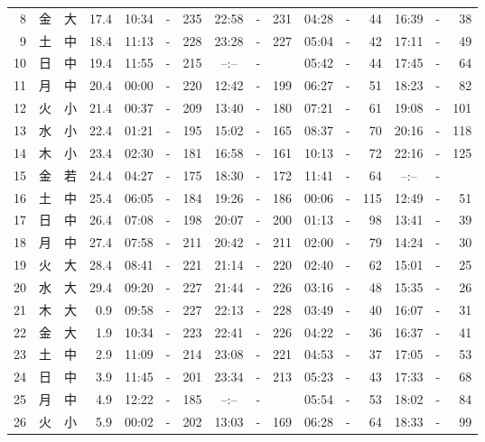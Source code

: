 \documentclass[12pt.a4j]{jsarticle}
\begin{document}
\begin{center}
\begin{table}[ht]
\begin{tabular}{|rc|cr|ccrccr|ccrccr|}
 8 & 金 & 大 & 17.4 &  10:34 &-& 235  &  22:58 &-& 231  &   04:28 &-&  44  &   16:39 &-&  38  \\
 9 & 土 & 中 & 18.4 &  11:13 &-& 228  &  23:28 &-& 227  &   05:04 &-&  42  &   17:11 &-&  49  \\
10 & 日 & 中 & 19.4 &  11:55 &-& 215  &  --:-- &-&     &   05:42 &-&  44  &   17:45 &-&  64  \\
11 & 月 & 中 & 20.4 &  00:00 &-& 220  &  12:42 &-& 199  &   06:27 &-&  51  &   18:23 &-&  82  \\
12 & 火 & 小 & 21.4 &  00:37 &-& 209  &  13:40 &-& 180  &   07:21 &-&  61  &   19:08 &-& 101  \\
13 & 水 & 小 & 22.4 &  01:21 &-& 195  &  15:02 &-& 165  &   08:37 &-&  70  &   20:16 &-& 118  \\
14 & 木 & 小 & 23.4 &  02:30 &-& 181  &  16:58 &-& 161  &   10:13 &-&  72  &   22:16 &-& 125  \\
15 & 金 & 若 & 24.4 &  04:27 &-& 175  &  18:30 &-& 172  &   11:41 &-&  64  &   --:-- &-&     \\
16 & 土 & 中 & 25.4 &  06:05 &-& 184  &  19:26 &-& 186  &   00:06 &-& 115  &   12:49 &-&  51  \\
17 & 日 & 中 & 26.4 &  07:08 &-& 198  &  20:07 &-& 200  &   01:13 &-&  98  &   13:41 &-&  39  \\
18 & 月 & 中 & 27.4 &  07:58 &-& 211  &  20:42 &-& 211  &   02:00 &-&  79  &   14:24 &-&  30  \\
19 & 火 & 大 & 28.4 &  08:41 &-& 221  &  21:14 &-& 220  &   02:40 &-&  62  &   15:01 &-&  25  \\
20 & 水 & 大 & 29.4 &  09:20 &-& 227  &  21:44 &-& 226  &   03:16 &-&  48  &   15:35 &-&  26  \\
21 & 木 & 大 &  0.9 &  09:58 &-& 227  &  22:13 &-& 228  &   03:49 &-&  40  &   16:07 &-&  31  \\
22 & 金 & 大 &  1.9 &  10:34 &-& 223  &  22:41 &-& 226  &   04:22 &-&  36  &   16:37 &-&  41  \\
23 & 土 & 中 &  2.9 &  11:09 &-& 214  &  23:08 &-& 221  &   04:53 &-&  37  &   17:05 &-&  53  \\
24 & 日 & 中 &  3.9 &  11:45 &-& 201  &  23:34 &-& 213  &   05:23 &-&  43  &   17:33 &-&  68  \\
25 & 月 & 中 &  4.9 &  12:22 &-& 185  &  --:-- &-&     &   05:54 &-&  53  &   18:02 &-&  84  \\
26 & 火 & 小 &  5.9 &  00:02 &-& 202  &  13:03 &-& 169  &   06:28 &-&  64  &   18:33 &-&  99  \\

\end{tabular}
\end{table}
\end{center}
\end{document}
